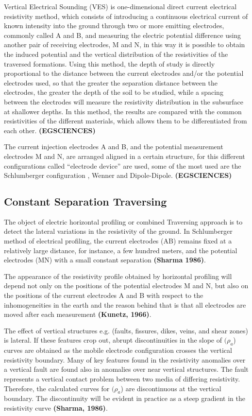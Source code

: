 \documentclass[12pt,a4paper]{report}
\begin{document}
Vertical Electrical Sounding (VES) is one-dimensional direct current electrical resistivity method, which consists of introducing a continuous electrical current of known intensity into the ground through two or more emitting electrodes, commonly called A and B, and measuring the electric potential difference using another pair of receiving electrodes, M and N, in this way it is possible to obtain the induced potential and the vertical distribution of the resistivities of the traversed formations. Using this method, the depth of study is directly proportional to the distance between the current electrodes and/or the potential electrodes used, so that the greater the separation distance between the electrodes, the greater the depth of the soil to be studied, while a spacing between the electrodes will measure the resistivity distribution in the subsurface at shallower depths. In this method, the results are compared with the common resistivities of the different materials, which allows them to be differentiated from each other. \textbf{(EGSCIENCES)}

The current injection electrodes A and B, and the potential measurement electrodes M and N, are arranged aligned in a certain structure, for this different configurations called “electrode device” are used, some of the most used are the Schlumberger configuration , Wenner and Dipole-Dipole. \textbf{(EGSCIENCES)}

\subsection{Constant Separation Traversing}
The object of electric horizontal profiling or combined Traversing
approach is to detect the lateral variations in the resistivity of the ground. In
Schlumberger method of electrical profiling, the current electrodes (AB)
remains fixed at a relatively large distance, for instance, a few hundred meters,
and the potential electrodes (MN) with a small constant separation \textbf{(Sharma
1986)}.

The appearance of the resistivity profile obtained by horizontal profiling will
depend not only on the positions of the potential electrodes M and N, but also
on the positions of the current electrodes A and B with respect to the
inhomogeneities in the earth and the reason behind that is that all electrodes are
moved after each measurement \textbf{(Kunetz, 1966)}.

The effect of vertical structures e.g. (faults, fissures, dikes, veins, and shear
zones) is lateral. If these features crop out, abrupt discontinuities in the slope of
\((\rho_a\)) curves are obtained as the mobile electrode configuration crosses the
vertical resistivity boundary. Many of key features found in the resistivity
anomalies over a vertical fault are found also in anomalies over near vertical
structures. The fault represents a vertical contact problem between two media of
differing resistivity. Therefore, the calculated curves for \((\rho_a\)) are discontinuous
at the vertical boundary. The discontinuity will be evident in practice as a steep
gradient in the resistivity curve \textbf{(Sharma, 1986)}.
\end{document}
